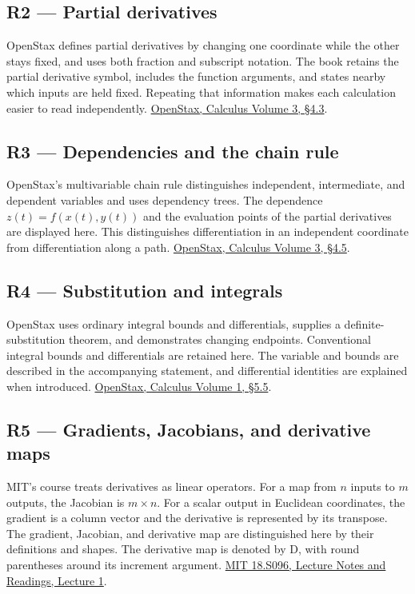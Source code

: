\documentclass[11pt,oneside,openany]{book}
\begin{document}
\subsection{R2 --- Partial derivatives}

OpenStax defines partial derivatives by changing one coordinate while the other stays fixed, and uses both fraction and subscript notation. The book retains the partial derivative symbol, includes the function arguments, and states nearby which inputs are held fixed. Repeating that information makes each calculation easier to read independently. \href{https://openstax.org/books/calculus-volume-3/pages/4-3-partial-derivatives}{OpenStax, Calculus Volume 3, §4.3}.

\subsection{R3 --- Dependencies and the chain rule}

OpenStax's multivariable chain rule distinguishes independent, intermediate, and dependent variables and uses dependency trees. The dependence \(z(t)=f(x(t),y(t))\) and the evaluation points of the partial derivatives are displayed here. This distinguishes differentiation in an independent coordinate from differentiation along a path. \href{https://openstax.org/books/calculus-volume-3/pages/4-5-the-chain-rule}{OpenStax, Calculus Volume 3, §4.5}.

\subsection{R4 --- Substitution and integrals}

OpenStax uses ordinary integral bounds and differentials, supplies a definite-substitution theorem, and demonstrates changing endpoints. Conventional integral bounds and differentials are retained here. The variable and bounds are described in the accompanying statement, and differential identities are explained when introduced. \href{https://openstax.org/books/calculus-volume-1/pages/5-5-substitution}{OpenStax, Calculus Volume 1, §5.5}.

\subsection{R5 --- Gradients, Jacobians, and derivative maps}

MIT's course treats derivatives as linear operators. For a map from \(n\) inputs to \(m\) outputs, the Jacobian is \(m\times n\). For a scalar output in Euclidean coordinates, the gradient is a column vector and the derivative is represented by its transpose. The gradient, Jacobian, and derivative map are distinguished here by their definitions and shapes. The derivative map is denoted by \(\mathrm D\), with round parentheses around its increment argument. \href{https://ocw.mit.edu/courses/18-s096-matrix-calculus-for-machine-learning-and-beyond-january-iap-2023/pages/lecture-notes-and-readings/}{MIT 18.S096, Lecture Notes and Readings, Lecture 1}.
\end{document}
